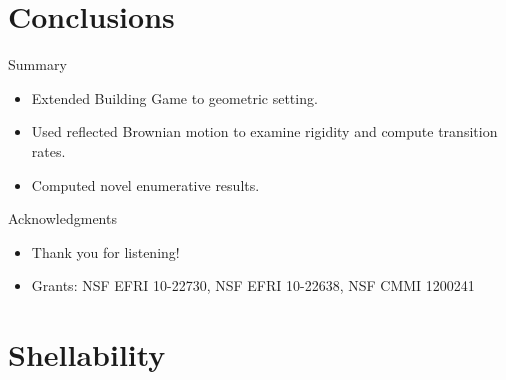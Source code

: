 \documentclass{beamer}
\begin{document}
\section{Conclusions}
\begin{frame}{Summary}
\begin{itemize}
  \item Extended Building Game to geometric setting.
  \item Used reflected Brownian motion to examine rigidity and compute transition rates.
  \item Computed novel enumerative results.
\end{itemize}
\end{frame}
\begin{frame}{Acknowledgments}
\begin{itemize}
\item Thank you for listening! 
\item Grants: NSF EFRI 10-22730, NSF EFRI 10-22638, NSF CMMI 1200241
\end{itemize}
\end{frame}


\section{Shellability}
\end{document}
